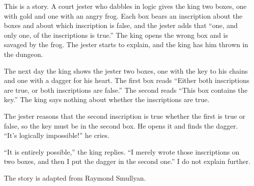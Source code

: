 
This is a story. A court jester who dabbles in logic gives the king two boxes, one with gold and one with an angry frog. Each box bears an inscription about the boxes and about which inscription is false, and the jester adds that ``one, and only one, of the inscriptions is true.'' The king opens the wrong box and is savaged by the frog.  The jester starts to explain, and the king has him thrown in the dungeon.

The next day the king shows the jester two boxes, one with the key to his chains and one with a dagger for his heart. The first box reads ``Either both inscriptions are true, or both inscriptions are false.'' The second reads ``This box contains the key.'' The king says nothing about whether the inscriptions are true.

The jester reasons that the second inscription is true whether the first is true or false, so the key must be in the second box. He opens it and finds the dagger. ``It's logically impossible!'' he cries. 

``It is entirely possible,'' the king replies. ``I merely wrote those inscriptions on two boxes, and then I put the dagger in the second one.'' I do not explain further.

The story is adapted from Raymond Smullyan. 
